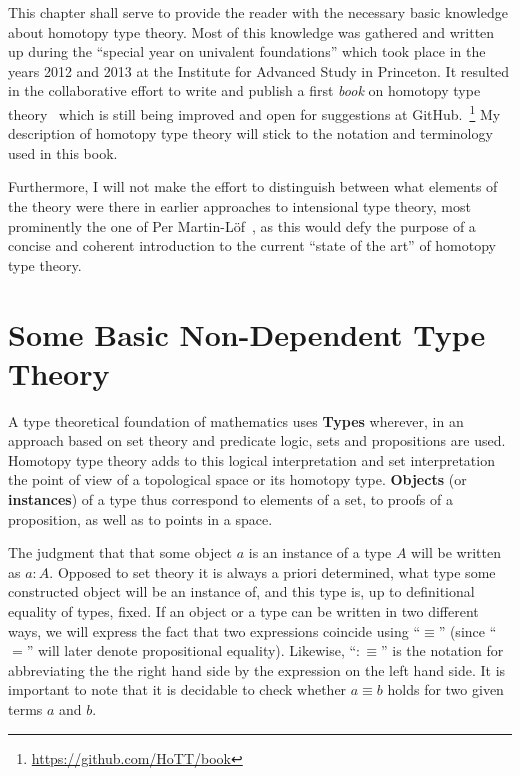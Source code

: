 This chapter shall serve to provide the reader with the necessary basic knowledge
about homotopy type theory.
Most of this knowledge was gathered and written up during the ``special year 
on univalent foundations'' which took place in the years 2012 and 2013
at the Institute for Advanced Study in Princeton.
It resulted in the collaborative effort to write and publish a first \emph{book}
on homotopy type theory~\cite{hottbook} which is still being improved and open
for suggestions at GitHub.~\footnote{\url{https://github.com/HoTT/book}}
My description of homotopy type theory will stick to the notation and terminology
used in this book.

Furthermore, I will not make the effort to distinguish between what elements of
the theory were there in earlier approaches to intensional type theory,
most prominently the one of Per Martin-L\"of~\cite{martin-lof1}, as this would
defy the purpose of a concise and coherent introduction to the current ``state of the art''
of homotopy type theory.

\section{Some Basic Non-Dependent Type Theory}

A type theoretical foundation of mathematics uses \textbf{Types} wherever,
in an approach based on set theory and predicate logic, sets and propositions
are used.
Homotopy type theory adds to this logical interpretation and set interpretation
the point of view of a topological space or its homotopy type.
\textbf{Objects} (or \textbf{instances}) of a type thus correspond to elements of
a set, to proofs of a proposition, as well as to points in a space.

The judgment that that some object $a$ is an instance of a type $A$ will be written
as $a : A$.
Opposed to set theory it is always a priori determined, what type some constructed
object will be an instance of, and this type is, up to definitional equality of
types, fixed.
If an object or a type can be written in two different ways, we will express the
fact that two expressions coincide using ``$\equiv$'' (since ``$=$'' will later
denote propositional equality).
Likewise, ``$:\equiv$'' is the notation for abbreviating the the right hand side
by the expression on the left hand side.
It is important to note that it is decidable to check whether $a \equiv b$ holds
for two given terms $a$ and $b$.

